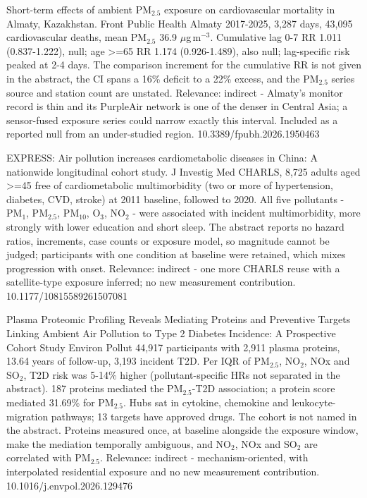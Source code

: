 \documentclass[10pt]{article}
\begin{document}
{Short-term effects of ambient PM$_{2.5}$ exposure on cardiovascular mortality in Almaty, Kazakhstan.}
{Front Public Health}
{Almaty 2017-2025, 3,287 days, 43,095 cardiovascular deaths, mean PM$_{2.5}$ 36.9 $\mu$g\,m$^{-3}$. Cumulative lag 0-7 RR 1.011 (0.837-1.222), null; age >=65 RR 1.174 (0.926-1.489), also null; lag-specific risk peaked at 2-4 days. The comparison increment for the cumulative RR is not given in the abstract, the CI spans a 16\% deficit to a 22\% excess, and the PM$_{2.5}$ series source and station count are unstated. Relevance: indirect - Almaty's monitor record is thin and its PurpleAir network is one of the denser in Central Asia; a sensor-fused exposure series could narrow exactly this interval. Included as a reported null from an under-studied region.}
{10.3389/fpubh.2026.1950463}

{EXPRESS: Air pollution increases cardiometabolic diseases in China: A nationwide longitudinal cohort study.}
{J Investig Med}
{CHARLS, 8,725 adults aged >=45 free of cardiometabolic multimorbidity (two or more of hypertension, diabetes, CVD, stroke) at 2011 baseline, followed to 2020. All five pollutants - PM$_{1}$, PM$_{2.5}$, PM$_{10}$, O$_3$, NO$_2$ - were associated with incident multimorbidity, more strongly with lower education and short sleep. The abstract reports no hazard ratios, increments, case counts or exposure model, so magnitude cannot be judged; participants with one condition at baseline were retained, which mixes progression with onset. Relevance: indirect - one more CHARLS reuse with a satellite-type exposure inferred; no new measurement contribution.}
{10.1177/10815589261507081}

{Plasma Proteomic Profiling Reveals Mediating Proteins and Preventive Targets Linking Ambient Air Pollution to Type 2 Diabetes Incidence: A Prospective Cohort Study}
{Environ Pollut}
{44,917 participants with 2,911 plasma proteins, 13.64 years of follow-up, 3,193 incident T2D. Per IQR of PM$_{2.5}$, NO$_2$, NOx and SO$_2$, T2D risk was 5-14\% higher (pollutant-specific HRs not separated in the abstract). 187 proteins mediated the PM$_{2.5}$-T2D association; a protein score mediated 31.69\% for PM$_{2.5}$. Hubs sat in cytokine, chemokine and leukocyte-migration pathways; 13 targets have approved drugs. The cohort is not named in the abstract. Proteins measured once, at baseline alongside the exposure window, make the mediation temporally ambiguous, and NO$_2$, NOx and SO$_2$ are correlated with PM$_{2.5}$. Relevance: indirect - mechanism-oriented, with interpolated residential exposure and no new measurement contribution.}
{10.1016/j.envpol.2026.129476}
\end{document}
